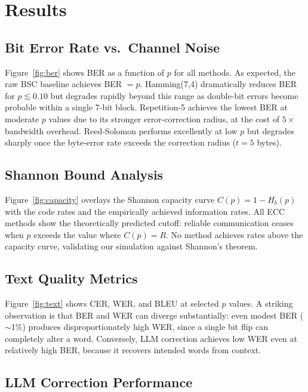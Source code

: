 \section{Results}
\label{sec:results}

\subsection{Bit Error Rate vs.\ Channel Noise}

Figure~\ref{fig:ber} shows BER as a function of $p$ for all methods.  As
expected, the raw BSC baseline achieves BER $= p$.  Hamming(7,4) dramatically
reduces BER for $p \lesssim 0.10$ but degrades rapidly beyond this range as
double-bit errors become probable within a single 7-bit block.  Repetition-5
achieves the lowest BER at moderate $p$ values due to its stronger
error-correction radius, at the cost of $5\times$ bandwidth overhead.
Reed-Solomon performs excellently at low $p$ but degrades sharply once the
byte-error rate exceeds the correction radius ($t=5$ bytes).

\subsection{Shannon Bound Analysis}

Figure~\ref{fig:capacity} overlays the Shannon capacity curve $C(p) = 1-H_b(p)$
with the code rates and the empirically achieved information rates.  All ECC
methods show the theoretically predicted cutoff: reliable communication ceases
when $p$ exceeds the value where $C(p) = R$.  No method achieves rates above
the capacity curve, validating our simulation against Shannon's theorem.

\subsection{Text Quality Metrics}

Figure~\ref{fig:text} shows CER, WER, and BLEU at selected $p$ values.  A
striking observation is that BER and WER can diverge substantially: even modest
BER ($\sim$1\%) produces disproportionately high WER, since a single bit flip
can completely alter a word.  Conversely, LLM correction achieves low WER even
at relatively high BER, because it recovers intended words from context.

\subsection{LLM Correction Performance}

